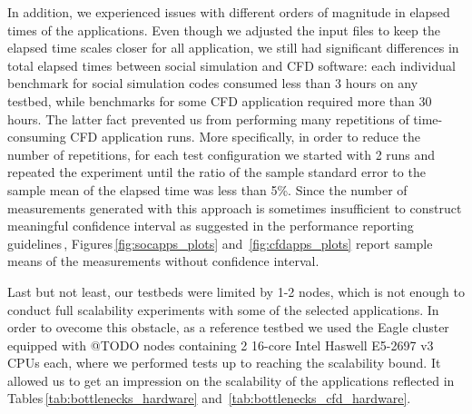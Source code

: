 In addition, we experienced issues with different orders of magnitude in elapsed times of the applications.
Even though we adjusted the input files to keep the elapsed time scales closer for all application,
we still had significant differences in total elapsed times between social simulation and CFD software:
each individual benchmark for social simulation codes consumed less than 3 hours on any testbed,
while benchmarks for some CFD application required more than 30 hours.
The latter fact prevented us from performing many repetitions of time-consuming CFD application runs.
More specifically, in order to reduce the number of repetitions, for each test configuration
we started with 2 runs and repeated the experiment %
until the ratio of the sample standard error to the sample mean of the elapsed time was less than 5\%.
Since the number of measurements generated with this approach
is sometimes insufficient to construct meaningful confidence interval as suggested in the performance reporting guidelines\,\cite{2015:Hoefler},
Figures\,\ref{fig:socapps_plots} and~\ref{fig:cfdapps_plots} report sample means of the measurements without confidence interval.

Last but not least,
our testbeds were limited by 1-2 nodes,
which is not enough to conduct full scalability experiments with some of the selected applications.
In order to ovecome this obstacle,
as a reference testbed we used the Eagle cluster equipped with @TODO nodes containing 2 16-core Intel Haswell E5-2697 v3 CPUs each,
where we performed tests up to reaching the scalability bound.
It allowed us to get an impression on the scalability of the applications reflected in Tables\,\ref{tab:bottlenecks_hardware} and~\ref{tab:bottlenecks_cfd_hardware}.


